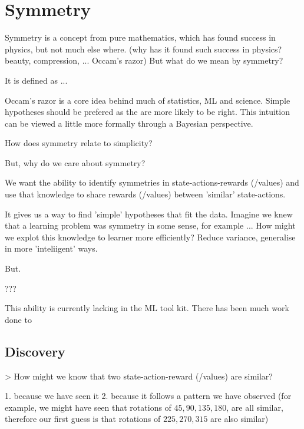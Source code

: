 \section{Symmetry}

Symmetry is a concept from pure mathematics, which has found success in physics,
but not much else where. (why has it found such success in physics? beauty, compression, ... Occam's razor)
But what do we mean by symmetry?


It is defined as ...

Occam's razor is a core idea behind much of statistics, ML and science. Simple
hypotheses should be prefered as the are more likely to be right. This intuition
can be viewed a little more formally through a Bayesian perspective.

How does symmetry relate to simplicity?

But, why do we care about symmetry?
\begin{displayquote}
We want the ability to identify symmetries in state-actions-rewards (/values) and use that knowledge to share rewards (/values) between 'similar' state-actions.
\end{displayquote}
It gives us a way to find 'simple' hypotheses that fit the data.
Imagine we knew that a learning problem was symmetry in some sense, for example ...
How might we explot this knowledge to learner more efficiently?
Reduce variance, generalise in more 'inteliigent' ways.

But.

???

This ability is currently lacking in the ML tool kit. There has been much work done
to


\subsection{Discovery}

> How might we know that two state-action-reward (/values) are similar?

1. because we have seen it
2. because it follows a pattern we have observed (for example, we might have seen
that rotations of $45, 90, 135, 180$, are all similar, therefore our first guess
is that rotations of $225, 270, 315$ are also similar)

